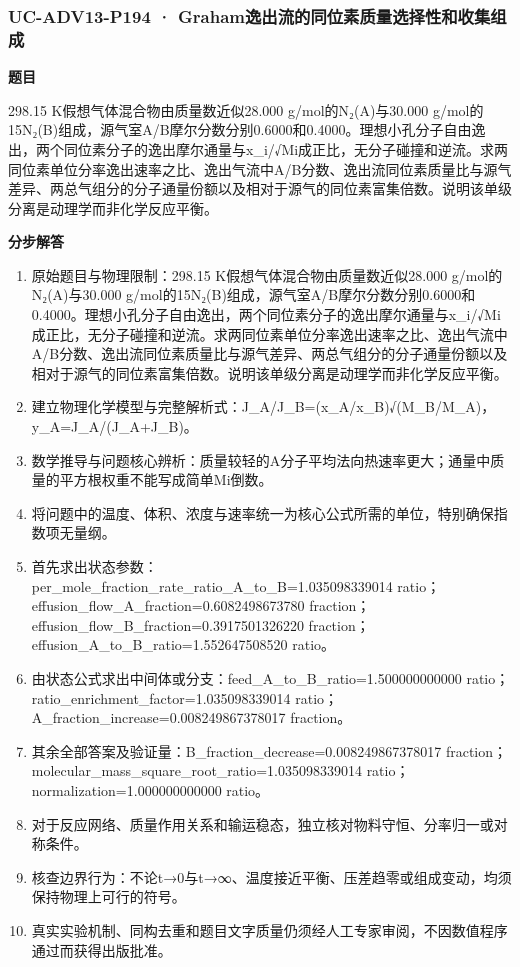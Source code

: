 \documentclass[UTF8,11pt,a4paper]{ctexart}
\begin{document}
\subsubsection*{UC-ADV13-P194 · Graham逸出流的同位素质量选择性和收集组成}
\noindent\textbf{题目}\par
298.15 K假想气体混合物由质量数近似28.000 g/mol的N₂(A)与30.000 g/mol的15N₂(B)组成，源气室A/B摩尔分数分别0.6000和0.4000。理想小孔分子自由逸出，两个同位素分子的逸出摩尔通量与x\_i/√Mi成正比，无分子碰撞和逆流。求两同位素单位分率逸出速率之比、逸出气流中A/B分数、逸出流同位素质量比与源气差异、两总气组分的分子通量份额以及相对于源气的同位素富集倍数。说明该单级分离是动理学而非化学反应平衡。\par
\medskip\noindent\textbf{分步解答}
\begin{enumerate}
\item 原始题目与物理限制：298.15 K假想气体混合物由质量数近似28.000 g/mol的N₂(A)与30.000 g/mol的15N₂(B)组成，源气室A/B摩尔分数分别0.6000和0.4000。理想小孔分子自由逸出，两个同位素分子的逸出摩尔通量与x\_i/√Mi成正比，无分子碰撞和逆流。求两同位素单位分率逸出速率之比、逸出气流中A/B分数、逸出流同位素质量比与源气差异、两总气组分的分子通量份额以及相对于源气的同位素富集倍数。说明该单级分离是动理学而非化学反应平衡。
\item 建立物理化学模型与完整解析式：J\_A/J\_B=(x\_A/x\_B)√(M\_B/M\_A)，y\_A=J\_A/(J\_A+J\_B)。
\item 数学推导与问题核心辨析：质量较轻的A分子平均法向热速率更大；通量中质量的平方根权重不能写成简单Mi倒数。
\item 将问题中的温度、体积、浓度与速率统一为核心公式所需的单位，特别确保指数项无量纲。
\item 首先求出状态参数：per\_mole\_fraction\_rate\_ratio\_A\_to\_B=1.035098339014 ratio；effusion\_flow\_A\_fraction=0.6082498673780 fraction；effusion\_flow\_B\_fraction=0.3917501326220 fraction；effusion\_A\_to\_B\_ratio=1.552647508520 ratio。
\item 由状态公式求出中间体或分支：feed\_A\_to\_B\_ratio=1.500000000000 ratio；ratio\_enrichment\_factor=1.035098339014 ratio；A\_fraction\_increase=0.008249867378017 fraction。
\item 其余全部答案及验证量：B\_fraction\_decrease=0.008249867378017 fraction；molecular\_mass\_square\_root\_ratio=1.035098339014 ratio；normalization=1.000000000000 ratio。
\item 对于反应网络、质量作用关系和输运稳态，独立核对物料守恒、分率归一或对称条件。
\item 核查边界行为：不论t→0与t→∞、温度接近平衡、压差趋零或组成变动，均须保持物理上可行的符号。
\item 真实实验机制、同构去重和题目文字质量仍须经人工专家审阅，不因数值程序通过而获得出版批准。
\end{enumerate}
\end{document}

